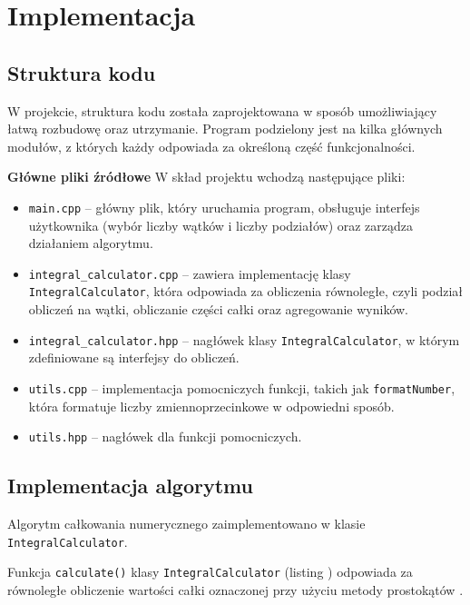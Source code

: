\newpage
\section{Implementacja}		%

\subsection{Struktura kodu}
W projekcie, struktura kodu została zaprojektowana w sposób umożliwiający łatwą rozbudowę oraz utrzymanie. Program podzielony jest na kilka głównych modułów, z których każdy odpowiada za określoną część funkcjonalności.

\textbf{Główne pliki źródłowe}
W skład projektu wchodzą następujące pliki:

\begin{itemize}
  \item \texttt{main.cpp} – główny plik, który uruchamia program, obsługuje interfejs użytkownika (wybór liczby wątków i liczby podziałów) oraz zarządza działaniem algorytmu.
  \item \texttt{integral\_calculator.cpp} – zawiera implementację klasy \texttt{IntegralCalculator}, która odpowiada za obliczenia równoległe, czyli podział obliczeń na wątki, obliczanie części całki oraz agregowanie wyników.
  \item \texttt{integral\_calculator.hpp} – nagłówek klasy \texttt{IntegralCalculator}, w którym zdefiniowane są interfejsy do obliczeń.
  \item \texttt{utils.cpp} – implementacja pomocniczych funkcji, takich jak \texttt{formatNumber}, która formatuje liczby zmiennoprzecinkowe w odpowiedni sposób.
  \item \texttt{utils.hpp} – nagłówek dla funkcji pomocniczych.
\end{itemize}

\newpage

\subsection{Implementacja algorytmu}
Algorytm całkowania numerycznego zaimplementowano w klasie \texttt{IntegralCalculator}.




Funkcja \texttt{calculate()} klasy \texttt{IntegralCalculator} (listing ) odpowiada za równoległe obliczenie wartości całki oznaczonej przy użyciu metody prostokątów \cite{RectangularIntegrationAGH}.

